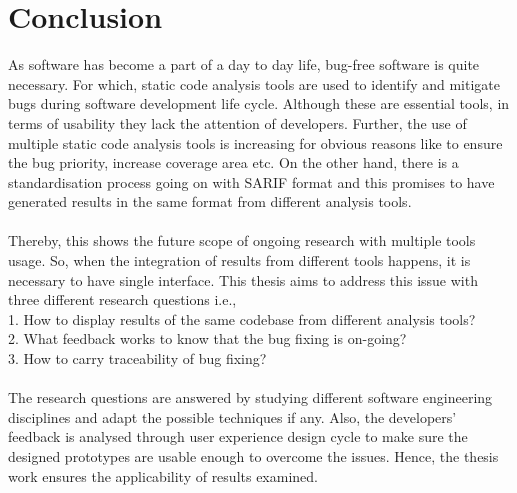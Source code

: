 \chapter{Conclusion}
\label{ch:conclusion}


As software has become a part of a day to day life, bug-free software is quite necessary. For which, static code analysis tools are used to identify and mitigate bugs during software development life cycle. Although these are essential tools, in terms of usability they lack the attention of developers. Further, the use of multiple static code analysis tools is increasing for obvious reasons like to ensure the bug priority, increase coverage area etc. On the other hand, there is a standardisation process going on with SARIF format and this promises to have generated results in the same format from different analysis tools. \\ \\

Thereby, this shows the future scope of ongoing research with multiple tools usage. So, when the integration of results from different tools happens, it is necessary to have single interface. This thesis aims to address this issue with three different research questions i.e., \\ 1. How to display results of the same codebase from different analysis tools? \\
2. What feedback works to know that the bug fixing is on-going? \\
3. How to carry traceability of bug fixing? \\ \\

The research questions are answered by studying different software engineering disciplines and adapt the possible techniques if any. Also, the developers' feedback is analysed through user experience design cycle to make sure the designed prototypes are usable enough to overcome the issues. Hence, the thesis work ensures the applicability of results examined.